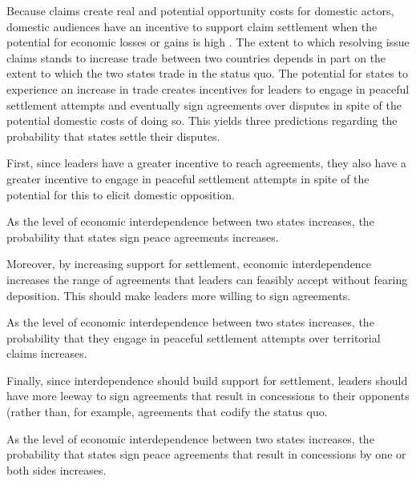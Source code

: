 \documentclass[../../dissertation.tex]{subfiles}
\begin{document}

Because claims create real and potential opportunity costs for domestic actors, domestic audiences have an incentive to support claim settlement when the potential for economic losses or gains is high \citep{lee2012, schultz2015}. The extent to which resolving issue claims stands to increase trade between two countries depends in part on the extent to which the two states trade in the status quo. The potential for states to experience an increase in trade creates incentives for leaders to engage in peaceful settlement attempts and eventually sign agreements over disputes in spite of the potential domestic costs of doing so. This yields three predictions regarding the probability that states settle their disputes. 

First, since leaders have a greater incentive to reach agreements, they also have a greater incentive to engage in peaceful settlement attempts in spite of the potential for this to elicit domestic opposition.

\begin{hypothesis} As the level of economic interdependence between two states increases, the probability that states sign peace agreements increases. \label{hyp: agreements} \end{hypothesis}

\noindent Moreover, by increasing support for settlement, economic interdependence increases the range of agreements that leaders can feasibly accept without fearing deposition. This should make leaders more willing to sign agreements. 

\begin{hypothesis} As the level of economic interdependence between two states increases, the probability that they engage in peaceful settlement attempts over territorial claims increases. \label{hyp: attempts} \end{hypothesis}

\noindent Finally, since interdependence should build support for settlement, leaders should have more leeway to sign agreements that result in concessions to their opponents (rather than, for example, agreements that codify the status quo.

\begin{hypothesis} As the level of economic interdependence between two states increases, the probability that states sign peace agreements that result in concessions by one or both sides increases. \label{hyp: concessions} \end{hypothesis}
\end{document}
